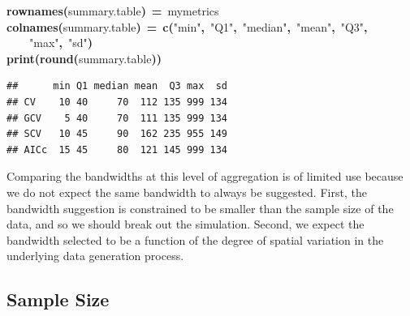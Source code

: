 \documentclass{article}
\makeatletter
\newcommand{\hlfunctioncall}[1]{\textcolor[rgb]{0.501960784313725,0,0.329411764705882}{\textbf{#1}}}%
\newcommand{\hlstring}[1]{\textcolor[rgb]{0.6,0.6,1}{#1}}%
\newcommand{\hlkeyword}[1]{\textcolor[rgb]{0,0,0}{\textbf{#1}}}%
\newcommand{\hlassignement}[1]{\textcolor[rgb]{0,0,0}{\textbf{#1}}}%
\newcommand{\hlsymbol}[1]{\textcolor[rgb]{0,0,0}{#1}}%
\newcommand{\hlstd}[1]{\textcolor[rgb]{0,0,0}{#1}}%
\newenvironment{kframe}{%
 \def\FrameCommand##1{\hskip\@totalleftmargin \hskip-\fboxsep
 \colorbox{shadecolor}{##1}\hskip-\fboxsep
     \hskip-\linewidth \hskip-\@totalleftmargin \hskip\columnwidth}%
 \MakeFramed {\advance\hsize-\width
   \@totalleftmargin\z@ \linewidth\hsize
   \@setminipage}}%
 {\par\unskip\endMakeFramed}
\newenvironment{knitrout}{}{} %
\makeatother
\begin{document}
\begin{knitrout}
\begin{kframe}
\begin{flushleft}
\hlstd{}\hlfunctioncall{rownames}\hlkeyword{(}\hlsymbol{summary.table}\hlkeyword{)}{\ }\hlassignement{=}{\ }\hlsymbol{mymetrics}\hspace*{\fill}\\
\hlstd{}\hlfunctioncall{colnames}\hlkeyword{(}\hlsymbol{summary.table}\hlkeyword{)}{\ }\hlassignement{=}{\ }\hlfunctioncall{c}\hlkeyword{(}\hlstring{"{}min"{}}\hlkeyword{,}{\ }\hlstring{"{}Q1"{}}\hlkeyword{,}{\ }\hlstring{"{}median"{}}\hlkeyword{,}{\ }\hlstring{"{}mean"{}}\hlkeyword{,}{\ }\hlstring{"{}Q3"{}}\hlkeyword{,}\hspace*{\fill}\\
\hlstd{}{\ }{\ }{\ }{\ }\hlstring{"{}max"{}}\hlkeyword{,}{\ }\hlstring{"{}sd"{}}\hlkeyword{)}\hspace*{\fill}\\
\hlstd{}\hlfunctioncall{print}\hlkeyword{(}\hlfunctioncall{round}\hlkeyword{(}\hlsymbol{summary.table}\hlkeyword{)}\hlkeyword{)}\mbox{}
\normalfont
\end{flushleft}
\begin{verbatim}
##      min Q1 median mean  Q3 max  sd
## CV    10 40     70  112 135 999 134
## GCV    5 40     70  111 135 999 134
## SCV   10 45     90  162 235 955 149
## AICc  15 45     80  121 145 999 134
\end{verbatim}
\end{kframe}
\end{knitrout}




Comparing the bandwidths at this level of aggregation is of limited use because we do not expect the same bandwidth to always be suggested. First, the bandwidth suggestion is constrained to be smaller than the sample size of the data, and so we should break out the simulation. Second, we expect the bandwidth selected to be a function of the degree of spatial variation in the underlying data generation process.

\subsection{Sample Size}
\end{document}
